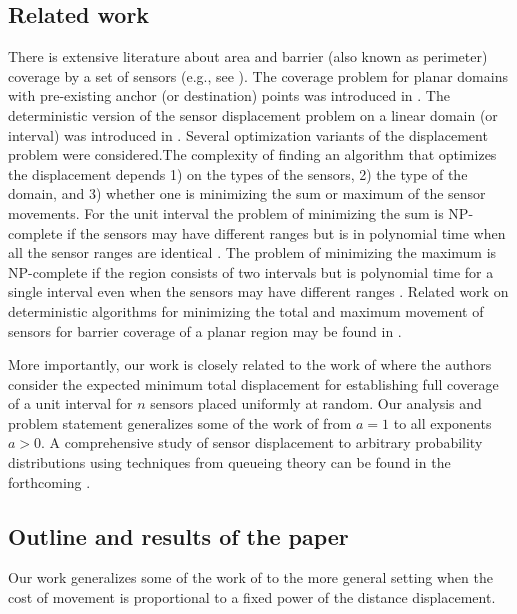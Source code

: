 \documentclass[final,5p,times,twocolumn]{elsarticle_mod}
\begin{document}
\subsection{Related work}

There is extensive literature about area and barrier (also known as perimeter) coverage by a set of sensors (e.g., see \cite{abbasi2009movement,barriercoverageNodeDegree,SSL07,kumar2005,saipulla2009,swat2012}). The coverage problem for planar domains with pre-existing anchor (or destination) points was introduced in \cite{tcs2009}. The deterministic version of the sensor displacement problem on a linear domain (or interval) was introduced in \cite{adhocnow2009}. Several optimization variants of the displacement problem were considered.The complexity of finding an algorithm that optimizes the displacement depends 1) on the types of the sensors, 2) the type of the domain, and 3) whether one is minimizing the sum or maximum of the sensor movements. For the unit interval the problem of minimizing the sum is NP-complete if the sensors may have different ranges but is in polynomial time when
all the sensor ranges are identical \cite{adhocnow2010}. The problem of 
minimizing the maximum is NP-complete if the region consists of two intervals \cite{adhocnow2009}
but is polynomial time for a single interval even when the sensors may have different
ranges \cite{swat2012}.
Related work on deterministic
algorithms for minimizing the total and maximum movement
of sensors for barrier coverage of a planar region may
be found in \cite{tcs2009}. 


More importantly, our work is closely related to the work of \cite{spa_2013} where the authors consider the expected minimum total displacement for establishing full coverage of a unit interval
for $n$ sensors placed uniformly at random. Our analysis and problem statement generalizes some of the work of \cite{spa_2013} from $a=1$ to all exponents $a > 0$. A comprehensive study of sensor displacement to arbitrary probability distributions using techniques from queueing theory can be found in the forthcoming \cite{kranakis2014scheduling}.


\subsection{Outline and results of the paper}

Our work generalizes some of the work
of \cite{spa_2013} to the more general setting
when the cost of movement is proportional to a fixed power
of the distance displacement.
\end{document}
